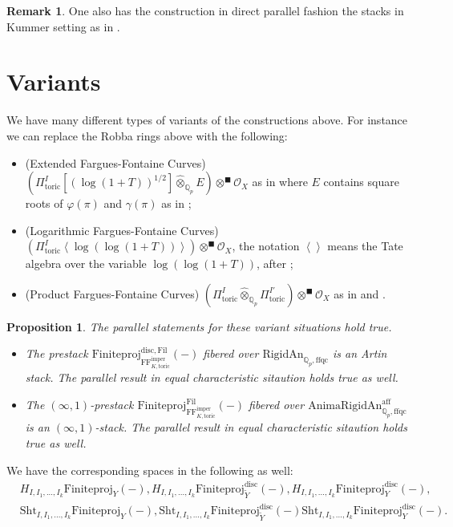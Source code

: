 \documentclass[12pt]{article}
\newtheorem{proposition}[theorem]{Proposition}
\theoremstyle{definition}
\newtheorem{remark}[theorem]{Remark}
\numberwithin{equation}{section}
\begin{document}
\begin{remark}
One also has the construction in direct parallel fashion the stacks in Kummer setting as in \cite{EG}.	
\end{remark}

\section{Variants}

We have many different types of variants of the constructions above. For instance we can replace the Robba rings above with the following:
\begin{itemize}
\item[A] (Extended Fargues-Fontaine Curves) $(\Pi^I_\mathrm{toric}[(\log(1+T))^{1/2}]\widehat{\otimes}_{\mathbb{Q}_p}E)\otimes^\blacksquare \mathcal{O}_X$ as in \cite{BS} where $E$ contains square roots of $\varphi(\pi)$ and $\gamma(\pi)$ as in \cite{BS}; 
\item[B] (Logarithmic Fargues-Fontaine Curves) $(\Pi^I_\mathrm{toric}\left<\log(\log(1+T))\right>)\otimes^\blacksquare \mathcal{O}_X$, the notation $\left<\right>$ means the Tate algebra over the variable $\log(\log(1+T))$, after \cite{Fon};
\item[C] (Product Fargues-Fontaine Curves) $(\Pi^I_\mathrm{toric}\widehat{\otimes}_{\mathbb{Q}_p}\Pi^{I'}_\mathrm{toric})\otimes^\blacksquare \mathcal{O}_X$ as in \cite{CKZ} and \cite{PZ}.
\end{itemize}

\begin{proposition}
The parallel statements for these variant situations hold true. 
\begin{itemize}
\item[$\square$] The prestack $\mathrm{Finiteproj}^{\mathrm{disc},\mathrm{Fil}}_{\mathrm{FF}^\mathrm{imper}_{K,\mathrm{toric}}}(-)$ fibered over $\mathrm{RigidAn}_{\mathbb{Q}_p,\mathrm{ffqc}}$ is an Artin stack. The parallel result in equal characteristic sitaution holds true as well.
\item[$\square$] The $(\infty,1)$-prestack $\mathrm{Finiteproj}^{\mathrm{Fil}}_{\mathrm{FF}^\mathrm{imper}_{K,\mathrm{toric}}}(-)$ fibered over $\mathrm{AnimaRigidAn}^\mathrm{aff}_{\mathbb{Q}_p,\mathrm{ffqc}}$ is an $(\infty,1)$-stack. The parallel result in equal characteristic sitaution holds true as well.
\end{itemize}
\end{proposition}

We have the corresponding spaces in the following as well:
\begin{align}
&H_{I,I_1,...,I_k}\mathrm{Finiteproj}_{{Y}}(-), H_{I,I_1,...,I_k}\mathrm{Finiteproj}^\mathrm{disc}_{\widetilde{Y}}(-), H_{I,I_1,...,I_k}\mathrm{Finiteproj}^\mathrm{disc}_{Y}(-),\\ 
&\mathrm{Sht}_{I,I_1,...,I_k}\mathrm{Finiteproj}_{{Y}}(-), \mathrm{Sht}_{I,I_1,...,I_k}\mathrm{Finiteproj}^\mathrm{disc}_{\widetilde{Y}}(-) \mathrm{Sht}_{I,I_1,...,I_k}\mathrm{Finiteproj}^\mathrm{disc}_{Y}(-).
\end{align}
\end{document}
